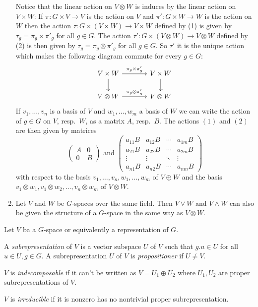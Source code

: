 \begin{expls}
\begin{enumerate}[label=\emph{\alph*)},leftmargin=*]
      Notice that the linear action on $V \otimes W$ is induces by the linear action on $V \times W$:
      If $\pi \colon G \times V \to V$ is the action on $V$ and $\pi' \colon G \times W \to W$ is the action on $W$ then the action $\tau \colon G \times (V \times W) \to V \times W$ defined by (1) is given by $\tau_g = \pi_g \times \pi'_g$ for all $g \in G$.
      The action $\tau' \colon G \times (V \otimes W) \to V \otimes W$ defined by (2) is then given by $\tau_g = \pi_g \otimes \pi'_g$ for all $g \in G$.
      So $\tau'$ it is the unique action which makes the following diagram commute for every $g \in G$:
      \[
        \begin{tikzcd}[column sep = large]
            V \times W
            \arrow{r}{\pi_g \times \pi'_g}
            \arrow{d}
          & V \times W
            \arrow{d}
          \\
            V \otimes W
            \arrow{r}{\pi_g \otimes \pi'_g}
          & V \otimes W
        \end{tikzcd}
      \]
      If $v_1, \dotsc, v_n$ is a basis of $V$ and $w_1, \dotsc, w_m$ a basis of $W$ we can write the action of $g \in G$ on $V$, resp.\ $W$, as a matrix $A$, resp.\ $B$.
      The actions $(1)$ and $(2)$ are then given by matrices
      \[
        \begin{pmatrix}
          A & 0 \\
          0 & B
        \end{pmatrix}
        \text{ and }
        \begin{pmatrix}
          a_{11} B & a_{12} B & \cdots & a_{1m} B \\
          a_{21} B & a_{22} B & \cdots & a_{2m} B \\
            \vdots  &  \vdots  & \ddots &  \vdots  \\
          a_{n1} B & a_{n2} B & \cdots & a_{nm} B
        \end{pmatrix}
      \]
      with respect to the basis $v_1, \dotsc, v_n, w_1, \dotsc, w_m$ of $V \oplus W$ and the basis $v_1 \otimes w_1, v_1 \otimes w_2, \dotsc, v_n \otimes w_m$ of $V \otimes W$.
    \item
      Let $V$ and $W$ be $G$-spaces over the same field.
      Then $V \vee W$ and $V \wedge W$ can also be given the structure of a $G$-space in the same way as $V \otimes W$.
  \end{enumerate}
\end{expls}


\begin{definition}
    Let $V$ ba a $G$-space or equivalently a representation of $G$.

    A \emph{subrepresentation} of $V$ is a vector subspace $U$ of $V$ such that $g.u \in U$ for all $u \in U, g \in G$.
    A subrepresentation $U$ of $V$ is \emph{propositioner} if $U \neq V$.
    
    $V$ is \emph{indecomposable} if it can’t be written as $V = U_1 \oplus U_2$ where $U_1, U_2$ are proper subrepresentations of $V$.
    
    $V$ is \emph{irreducible} if it is nonzero has no nontrivial proper subrepresentation.
\end{definition}


